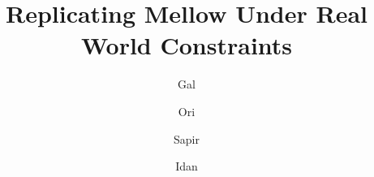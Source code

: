 \documentclass[cameraready]{Interspeech}
\title{Replicating Mellow Under Real World Constraints}
\author[affiliation={1}]{Gal}{Aharoni}
\author[affiliation={1}]{Ori}{Baron}
\author[affiliation={1}]{Sapir}{Talmi}
\author[affiliation={1}]{Idan}{Tarshish}
\begin{document}
\maketitle


\begin{abstract}


\end{abstract}
\end{document}
